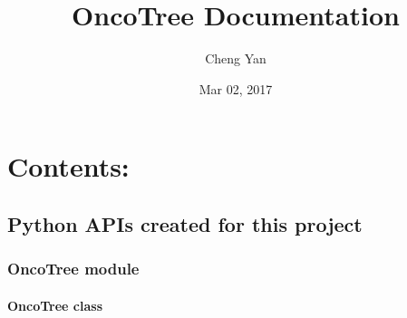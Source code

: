 \documentclass[letterpaper,10pt,english]{sphinxmanual}
\title{OncoTree Documentation}
\date{Mar 02, 2017}
\author{Cheng Yan}
\begin{document}
\maketitle
\tableofcontents
{}\label{index::doc}



\chapter{Contents:}
\label{index:welcome-to-oncotree-s-documentation}\label{index:contents}

\section{Python APIs created for this project}
\label{API:python-apis-created-for-this-project}\label{API::doc}

\subsection{OncoTree module}
\label{API:oncotree-module}

\subsubsection{OncoTree class}
\label{API:oncotree-class}\label{API:oncotree}
\end{document}
